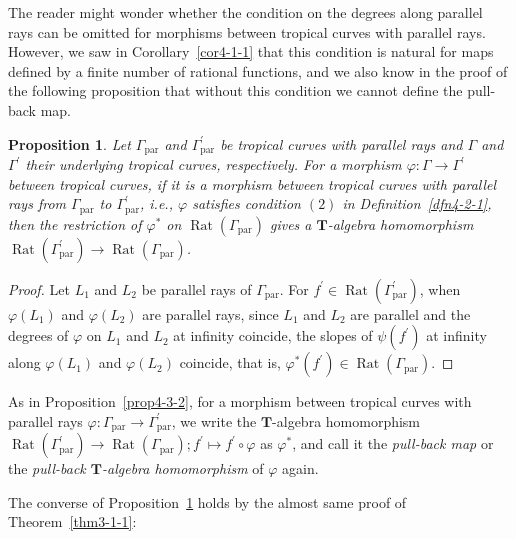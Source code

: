 \documentclass[a4paper,12pt]{amsart}
\newtheorem{prop}[dfn]{Proposition}
\def\Gamma{\varGamma}
\begin{document}
The reader might wonder whether the condition on the degrees along parallel rays can be omitted for morphisms between tropical curves with parallel rays.
However, we saw in Corollary~\ref{cor4-1-1} that this condition is natural for maps defined by a finite number of rational functions, and we also know in the proof of the following proposition that without this condition we cannot define the pull-back map.

\begin{prop}
    \label{prop4-2-1}
Let $\Gamma_{\operatorname{par}}$ and $\Gamma^{\prime}_{\operatorname{par}}$ be tropical curves with parallel rays and $\Gamma$ and $\Gamma^{\prime}$ their underlying tropical curves, respectively.
For a morphism $\varphi : \Gamma \to \Gamma^{\prime}$ between tropical curves, if it is a morphism between tropical curves with parallel rays from $\Gamma_{\operatorname{par}}$ to $\Gamma^{\prime}_{\operatorname{par}}$, i.e., $\varphi$ satisfies condition $(2)$ in Definition~\ref{dfn4-2-1}, then the restriction of $\varphi^{\ast}$ on $\operatorname{Rat}(\Gamma_{\operatorname{par}})$ gives a $\boldsymbol{T}$-algebra homomorphism $\operatorname{Rat}(\Gamma^{\prime}_{\operatorname{par}}) \to \operatorname{Rat}(\Gamma_{\operatorname{par}})$.
\end{prop}

\begin{proof}
Let $L_1$ and $L_2$ be parallel rays of $\Gamma_{\operatorname{par}}$.
For $f^{\prime} \in \operatorname{Rat}(\Gamma^{\prime}_{\operatorname{par}})$, when $\varphi(L_1)$ and $\varphi(L_2)$ are parallel rays, since $L_1$ and $L_2$ are parallel and the degrees of $\varphi$ on $L_1$ and $L_2$ at infinity coincide, the slopes of $\psi(f^{\prime})$ at infinity along $\varphi(L_1)$ and $\varphi(L_2)$ coincide, that is, $\varphi^{\ast}(f^{\prime}) \in \operatorname{Rat}(\Gamma_{\operatorname{par}})$.
\end{proof}

As in Proposition~\ref{prop4-3-2}, for a morphism between tropical curves with parallel rays $\varphi : \Gamma_{\operatorname{par}} \to \Gamma^{\prime}_{\operatorname{par}}$, we write the $\boldsymbol{T}$-algebra homomorphism $\operatorname{Rat}(\Gamma^{\prime}_{\operatorname{par}}) \to \operatorname{Rat}(\Gamma_{\operatorname{par}}); f^{\prime} \mapsto f^{\prime} \circ \varphi$ as $\varphi^{\ast}$, and call it the \textit{pull-back map} or the \textit{pull-back $\boldsymbol{T}$-algebra homomorphism} of $\varphi$ again. 

The converse of Proposition~\ref{prop4-2-1} holds by the almost same proof of Theorem~\ref{thm3-1-1}:
\end{document}
